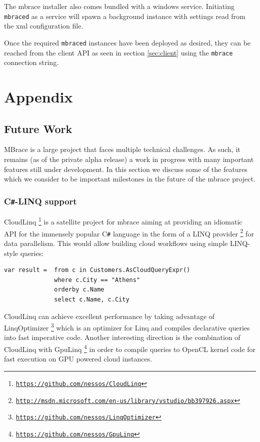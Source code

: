 \documentclass[9pt,a4paper]{article}
\newcommand{\mbrace}{mbrace}
\newcommand{\Mbrace}{MBrace}
\newcommand{\csharp}{C\texttt \#}
\newcommand{\samehref}[1]{\href{#1}{\texttt{#1}}}
\begin{document}
The \mbrace{} installer also comes bundled with a windows service.
Initiating \texttt{mbraced} as a service will spawn a background instance
with settings read from the xml configuration file.

Once the required \texttt{mbraced} instances have been deployed as desired,
they can be reached from the client API as seen in section \ref{sec:client}
using the \texttt{mbrace} connection string.

%
\appendix
%
%
%

\section*{Appendix}

\subsection*{Future Work}

\Mbrace{} is a large project that faces multiple technical challenges. As such,
it remains (as of the private alpha release) a work in progress with many important
features still under development. In this section we discuss some of the features
which we consider to be important milestones in the future of the \mbrace{} project.

\subsubsection*{\csharp{}-LINQ support}
CloudLinq%
\footnote{\samehref{https://github.com/nessos/CloudLinq}}
is a satellite project for \mbrace{} aiming at providing an idiomatic 
API for the immensely popular \csharp{} language in the
form of a LINQ provider%
\footnote{\samehref{http://msdn.microsoft.com/en-us/library/vstudio/bb397926.aspx}}
for data parallelism. This would allow building cloud workflows using simple
LINQ-style queries:
\begin{lstlisting}[language=CSharp]
var result =  from c in Customers.AsCloudQueryExpr()
			  where c.City == "Athens"
			  orderby c.Name
			  select c.Name, c.City
\end{lstlisting}
CloudLinq can achieve excellent performance by taking advantage of LinqOptimizer%
\footnote{\samehref{https://github.com/nessos/LinqOptimizer}}
which is an optimizer for Linq and compiles declarative queries into fast imperative code. Another interesting direction is the combination
of CloudLinq with GpuLinq%
\footnote{\samehref{https://github.com/nessos/GpuLinq}}
in order to compile queries to OpenCL kernel code for fast execution on GPU powered cloud instances.
\end{document}
